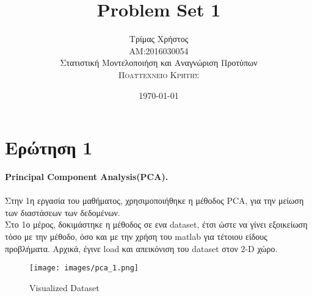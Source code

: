\documentclass[12pt]{article}
\title{Problem Set 1} %
\author{Τρίμας Χρήστος\\ %
AM:2016030054 \\ Στατιστική Μοντελοποιήση και Αναγνώριση Προτύπων\\ %
\textsc{Πολυτεχνείο Κρήτης}
}
\date{\today} %
\begin{document}
\setlength{\droptitle}{-5em}    
\maketitle


\section*{Ερώτηση 1}
{\bfseries Principal Component Analysis(PCA).}\\ \\
Στην 1η εργασία του μαθήματος, χρησιμοποιήθηκε η μέθοδος PCA, για την μείωση των διαστάσεων των δεδομένων.\\
 Στο 1ο μέρος, δοκιμάστηκε η μέθοδος σε ενα dataset, έτσι ώστε να γίνει εξοικείωση τόσο με την μέθοδο, όσο και με την χρήση του matlab για τέτοιου είδους προβλήματα. Αρχικά, έγινε load και απεικόνιση του dataset στον 2-D χώρο.\\
 \begin{figure}[!h]
     \centering
     \texttt{[image: images/pca\_1.png]}
     \caption{Visualized Dataset}
     \label{fig:my_label}
 \end{figure}
 
\end{document}
